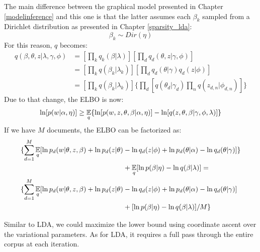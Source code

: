 The main difference between the graphical model presented in Chapter \ref{modelinference} and this one
is that the latter assumes each $\beta_k$ sampled from a Dirichlet distribution as presented in Chapter \ref{sparsity_lda}:
\begin{equation}
    \beta_k \sim Dir(\eta)
\end{equation}
For this reason, $q$ becomes:
\begin{equation*}
    \begin{split}
        q(\beta, \theta, z| \lambda, \gamma, \phi) & = [\prod_k q_k(\beta | \lambda)] [\prod_d q_d(\theta, z | \gamma, \phi)] \\
        & = [\prod_k q(\beta_k | \lambda_k)] [\prod_d q_d(\theta | \gamma) q_d(z | \phi)] \\
        & = [\prod_k q(\beta_k | \lambda_k)] \{\prod_d [q(\theta_d | \gamma_d) \prod_n q(z_{d,n} | \phi_{d,n})]\}
    \end{split}
\end{equation*}
Due to that change, the ELBO is now:
\begin{equation*}
    \ln [p(w | \alpha, \eta)] \geq \operatorname*{\mathbb{E}}_q\{ \ln [p(w, z, \theta, \beta | \alpha, \eta)] - \ln[q(z, \theta, \beta | \gamma, \phi, \lambda)] \}
\end{equation*}
If we have $M$ documents, the ELBO can be factorized as:
\begin{equation*}
    \begin{split}
        \{\sum_{d=1}^M \operatorname*{\mathbb{E}}_{q} [ \ln p_d(w | \theta, z, \beta) + \ln p_d(z | \theta) & - \ln q_d(z | \phi) + \ln p_d(\theta | \alpha) - \ln q_d(\theta | \gamma)]\} \\
        & + \operatorname*{\mathbb{E}}_q[\ln p(\beta | \eta) - \ln q(\beta | \lambda)] = \\
        \{\sum_{d=1}^M \operatorname*{\mathbb{E}}_{q} [ \ln p_d(w | \theta, z, \beta) + \ln p_d(z | \theta) & - \ln q_d(z | \phi) + \ln p_d(\theta | \alpha) - \ln q_d(\theta | \gamma)] \\
        & + [\ln p(\beta | \eta) - \ln q(\beta | \lambda)]/M \} \\
    \end{split}
\end{equation*}

Similar to LDA, we could maximize the lower bound using coordinate ascent over the variational parameters.
As for LDA, it requires a full pass through the entire corpus at each iteration.


